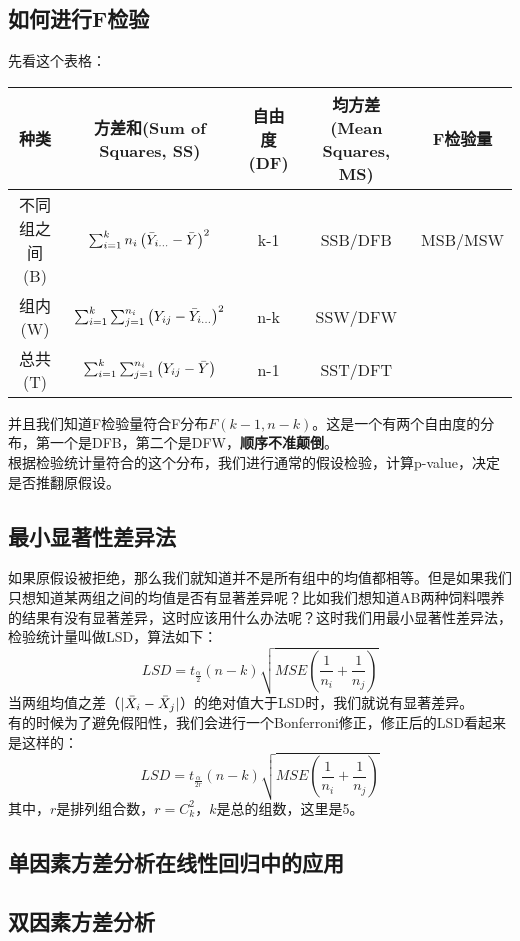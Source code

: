 \documentclass{MGLSA-cn-book-math}
\begin{document}
\subsection{如何进行F检验}
先看这个表格：
\begin{center}
    \begin{tabular}{|c|c|c|c|c|}
    \hline\hline
         种类&方差和(Sum of Squares, SS)&自由度(DF)&均方差(Mean Squares, MS)&F检验量 \\\hline
         不同组之间(B)&$\sum_{i=1}^kn_i\left(\Bar{Y}_{i\dots}-\Bar{Y}\right)^2$&k-1&SSB/DFB&MSB/MSW\\\hline
         组内(W)&$\sum_{i=1}^k\sum_{j=1}^{n_i}\left(Y_{ij}-\Bar{Y}_{i\dots}\right)^2$&n-k&SSW/DFW&~\\\hline
         总共(T)&$\sum_{i=1}^k\sum_{j=1}^{n_i}\left(Y_{ij}-\Bar{Y}\right)$&n-1&SST/DFT&~\\ \hline\hline
    \end{tabular}
\end{center}
并且我们知道F检验量符合F分布$F(k-1,n-k)$。这是一个有两个自由度的分布，第一个是DFB，第二个是DFW，\textbf{顺序不准颠倒}。\\
根据检验统计量符合的这个分布，我们进行通常的假设检验，计算p-value，决定是否推翻原假设。
\subsection{最小显著性差异法}
如果原假设被拒绝，那么我们就知道并不是所有组中的均值都相等。但是如果我们只想知道某两组之间的均值是否有显著差异呢？比如我们想知道AB两种饲料喂养的结果有没有显著差异，这时应该用什么办法呢？这时我们用最小显著性差异法，检验统计量叫做LSD，算法如下：
\[
LSD=t_{\frac{\alpha}{2}}(n-k)\sqrt{MSE\left(\frac{1}{n_i}+\frac{1}{n_j}\right)}
\]
当两组均值之差（$|\Bar{X}_i-\Bar{X}_j|$）的绝对值大于LSD时，我们就说有显著差异。\\
有的时候为了避免假阳性，我们会进行一个Bonferroni修正，修正后的LSD看起来是这样的：
\[
LSD=t_{\frac{\alpha}{2r}}(n-k)\sqrt{MSE\left(\frac{1}{n_i}+\frac{1}{n_j}\right)}
\]
其中，$r$是排列组合数，$r=C_k^2$，$k$是总的组数，这里是5。
\subsection{单因素方差分析在线性回归中的应用}

\subsection{双因素方差分析}
\end{document}
